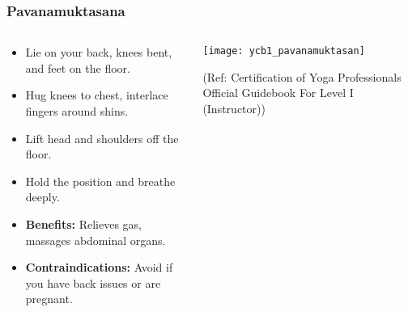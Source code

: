 \begin{frame}[fragile]\frametitle{Pavanamuktasana}
\begin{columns}
    \begin{column}[T]{0.5\linewidth}
      \begin{itemize}
        \item Lie on your back, knees bent, and feet on the floor.
        \item Hug knees to chest, interlace fingers around shins.
        \item Lift head and shoulders off the floor.
        \item Hold the position and breathe deeply.
        \item \textbf{Benefits:} Relieves gas, massages abdominal organs.
        \item \textbf{Contraindications:} Avoid if you have back issues or are pregnant.
      \end{itemize}
    \end{column}
    \begin{column}[T]{0.5\linewidth}
        \begin{center}
        \begin{center}
		        \texttt{[image: ycb1\_pavanamuktasan]}
				
				{\tiny (Ref: Certification  of Yoga Professionals Official Guidebook For Level I (Instructor))}	        
		\end{center}   
        \end{center}    
    \end{column}
  \end{columns}
\end{frame}

